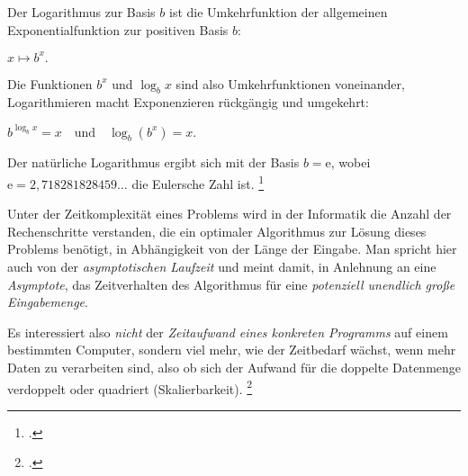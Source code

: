 \documentclass{bschlangaul-theorie}
\begin{document}
\begin{liExkurs}[Logarithmus]
Der Logarithmus zur Basis $b$ ist die Umkehrfunktion der allgemeinen
Exponentialfunktion zur positiven Basis $b$:

$x \mapsto b^x.$

Die Funktionen $b^x$ und $\log_b x$ sind also Umkehrfunktionen
voneinander, \dh Logarithmieren macht Exponenzieren rückgängig und
umgekehrt:

$b^{\log_b x} = x \quad \text{und} \quad \log_b(b^x) = x.$

Der natürliche Logarithmus ergibt sich mit der Basis $b=\mathrm{e}$,
wobei $\mathrm{e} = 2{,}718281828459\ldots$ die Eulersche Zahl ist.
\footcite[Definition / Als Umkehrfunktion der Exponentialfunktion]{wiki:logarithmus}
\end{liExkurs}
\begin{liExkurs}%
Unter der Zeitkomplexität eines Problems wird in der Informatik die
Anzahl der Rechenschritte verstanden, die ein optimaler Algorithmus zur
Lösung dieses Problems benötigt, in Abhängigkeit von der Länge der
Eingabe. Man spricht hier auch von der \emph{asymptotischen Laufzeit}
und meint damit, in Anlehnung an eine \emph{Asymptote}, das
Zeitverhalten des Algorithmus für eine \emph{potenziell unendlich große
Eingabemenge}.

Es interessiert also \emph{nicht} der \emph{Zeitaufwand eines konkreten
Programms} auf einem bestimmten Computer, sondern viel mehr, wie der
Zeitbedarf wächst, wenn mehr Daten zu verarbeiten sind, also \zB ob
sich der Aufwand für die doppelte Datenmenge verdoppelt oder quadriert
(Skalierbarkeit).
\footcite{wiki:zeitkomplexitaet}
\end{liExkurs}

\literatur
\end{document}
